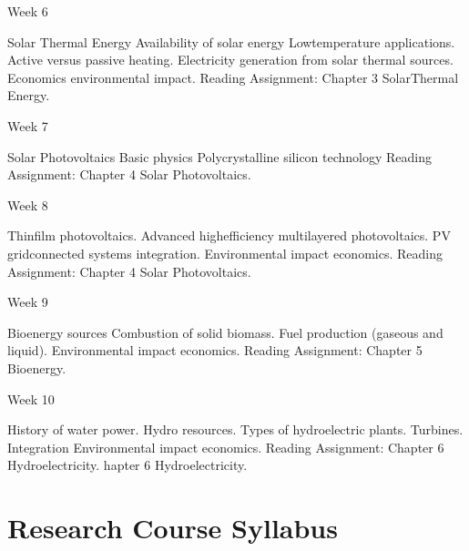 \documentclass[letterpaper,10pt,english]{jupyterBook}
\begin{document}
\begin{sphinxVerbatim}[commandchars=\\\{\}]
\PYGZsh{}\PYGZsh{}\PYGZsh{} Week 6

\PYGZhy{}   Solar Thermal Energy
\PYGZhy{}   Availability of solar energy
\PYGZhy{}   Low\PYGZhy{}temperature applications.
\PYGZhy{}   Active versus passive heating.
\PYGZhy{}   Electricity generation from solar thermal sources.
\PYGZhy{}   Economics \PYGZam{} environmental impact.
\PYGZhy{}   Reading Assignment: Chapter 3 \PYGZhy{} Solar\PYGZhy{}Thermal Energy.

\PYGZsh{}\PYGZsh{}\PYGZsh{} Week 7

\PYGZhy{}   Solar Photovoltaics
\PYGZhy{}   Basic physics
\PYGZhy{}   Polycrystalline silicon technology
\PYGZhy{}   Reading Assignment: Chapter 4 \PYGZhy{} Solar Photovoltaics.

\PYGZsh{}\PYGZsh{}\PYGZsh{} Week 8

\PYGZhy{}   Thin\PYGZhy{}film photovoltaics.
\PYGZhy{}   Advanced high\PYGZhy{}efficiency multi\PYGZhy{}layered photovoltaics.
\PYGZhy{}   PV grid\PYGZhy{}connected systems \PYGZam{} integration.
\PYGZhy{}   Environmental impact \PYGZam{} economics.
\PYGZhy{}   Reading Assignment: Chapter 4 \PYGZhy{} Solar Photovoltaics.

\PYGZsh{}\PYGZsh{}\PYGZsh{} Week 9

\PYGZhy{}   Bioenergy sources
\PYGZhy{}   Combustion of solid biomass.
\PYGZhy{}   Fuel production (gaseous and liquid).
\PYGZhy{}   Environmental impact \PYGZam{} economics.
\PYGZhy{}   Reading Assignment: Chapter 5 \PYGZhy{} Bioenergy.

\PYGZsh{}\PYGZsh{}\PYGZsh{} Week 10

\PYGZhy{}   History of water power.
\PYGZhy{}   Hydro resources.
\PYGZhy{}   Types of hydroelectric plants.
\PYGZhy{}   Turbines.
\PYGZhy{}   Integration
\PYGZhy{}   Environmental impact \PYGZam{} economics.
\PYGZhy{}   Reading Assignment: Chapter 6 \PYGZhy{} Hydroelectricity.
hapter 6\PYGZhy{} Hydroelectricity.
\end{sphinxVerbatim}

\sphinxstepscope


\chapter{Research Course Syllabus}
\label{\detokenize{ProjectSyllabus:research-course-syllabus}}\label{\detokenize{ProjectSyllabus::doc}}
\end{document}

